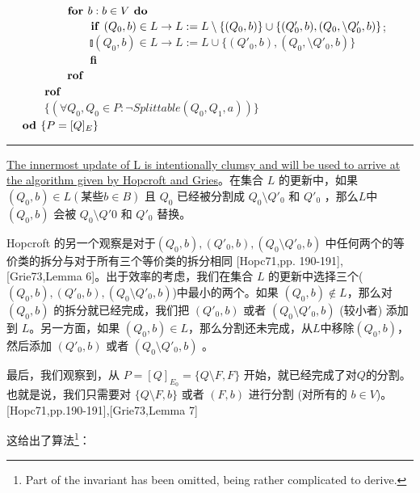 \mbox{　　　　　} $ \mbox{\textbf{for }} b:b \in V \mbox{\textbf{ do }} $ \\
\mbox{　　　　　　　} $ \mbox{\textbf{if }} (Q_0,b) \in L \rightarrow L := L \setminus \{ (Q_0,b) \} \cup \{ (Q'_0,b),(Q_0, \setminus Q'_0,b ) \} $;\\ 
\mbox{　　　　　　　} $ \talloblong (Q_0,b) \in L \rightarrow L := L \cup \{ (Q'_0,b),(Q_0, \setminus Q'_0,b ) \} $ \\
\mbox{　　　　　　　} $ \mbox{\textbf{fi}} $ \\
\mbox{　　　　　} $ \mbox{\textbf{rof}} $ \\
\mbox{　　　} $ \mbox{\textbf{rof}} $ \\
\mbox{　　　} $ \{ (\forall Q_0,Q_0 \in P : \neg Splittable(Q_0,Q_1,a)) \} $ \\
\mbox{　} $ \mbox{\textbf{od }} \{ P = [Q]_E \} $ \\
\rule{\textwidth}{1pt}

\uline{The innermost update of L is intentionally clumsy and will be used to arrive at the algorithm given by Hopcroft and Gries}。在集合 $L$ 的更新中，如果 $ (Q_0,b) \in L (\mbox{某些}b \in B) $ 且 $Q_0$ 已经被分割成 $ Q_0 \setminus Q'_0 $ 和 $ Q'_0 $ ，那么$L$中 $(Q_0,b)$ 会被 $ Q_0 \setminus Q'0 $ 和 $ Q'_0 $ 替换。

Hopcroft 的另一个观察是对于$ (Q_0,b),(Q'_0,b) ,(Q_0 \setminus Q'_0,b) $ 中任何两个的等价类的拆分与对于所有三个等价类的拆分相同 [Hopc71,pp. 190-191],[Grie73,Lemma 6]。出于效率的考虑，我们在集合 $L$ 的更新中选择三个($ (Q_0,b),(Q'_0,b) ,(Q_0 \setminus Q'_0,b) $)中最小的两个。如果 $(Q_0,b) \not\in L$，那么对 $(Q_0,b)$ 的拆分就已经完成，我们把 $ (Q'_0,b) $ 或者  $ (Q_0 \setminus Q'_0,b) $ (较小者) 添加到 $L$。另一方面，如果  $(Q_0,b) \in L$，那么分割还未完成，从$L$中移除$(Q_0,b)$，然后添加 $ (Q'_0,b) $ 或者  $ (Q_0 \setminus Q'_0,b) $ 。

最后，我们观察到，从 $ P= [Q]_{E_0} = \{ Q \setminus F,F \} $ 开始，就已经完成了对$Q$的分割。也就是说，我们只需要对 $ \{ Q \setminus F,b \} $ 或者 $ (F,b) $ 进行分割 (对所有的 $b\in V$)。[Hopc71,pp.190-191],[Grie73,Lemma 7]

这给出了算法\footnote{Part of the invariant has been omitted, being rather complicated to derive.}：

